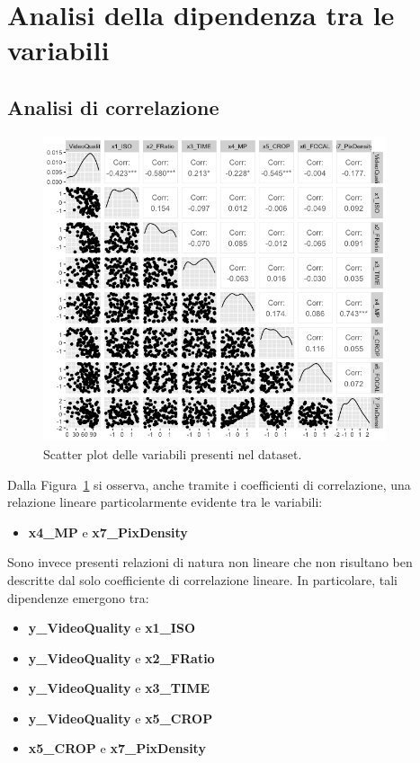 \section{Analisi della dipendenza tra le variabili}

\subsection{Analisi di correlazione}
\begin{figure}[H]
	\centering
	\includegraphics[width=0.90\textwidth]{graphs/DescriptiveStatisticPlots/ggplot}
	\caption{Scatter plot delle variabili presenti nel dataset.}
	\label{fig:scatter}
\end{figure}

Dalla Figura~\ref{fig:scatter} si osserva, anche tramite i coefficienti di correlazione, una relazione lineare particolarmente evidente tra le variabili:
\begin{itemize}
	\item \textbf{x4\_MP} e \textbf{x7\_PixDensity}
\end{itemize}

Sono invece presenti relazioni di natura non lineare che non risultano ben descritte dal solo coefficiente di correlazione lineare. In particolare, tali dipendenze emergono tra:
\begin{itemize}
	\item \textbf{y\_VideoQuality} e \textbf{x1\_ISO}
	\item \textbf{y\_VideoQuality} e \textbf{x2\_FRatio}
	\item \textbf{y\_VideoQuality} e \textbf{x3\_TIME}
	\item \textbf{y\_VideoQuality} e \textbf{x5\_CROP}
	\item \textbf{x5\_CROP} e \textbf{x7\_PixDensity}
\end{itemize}

